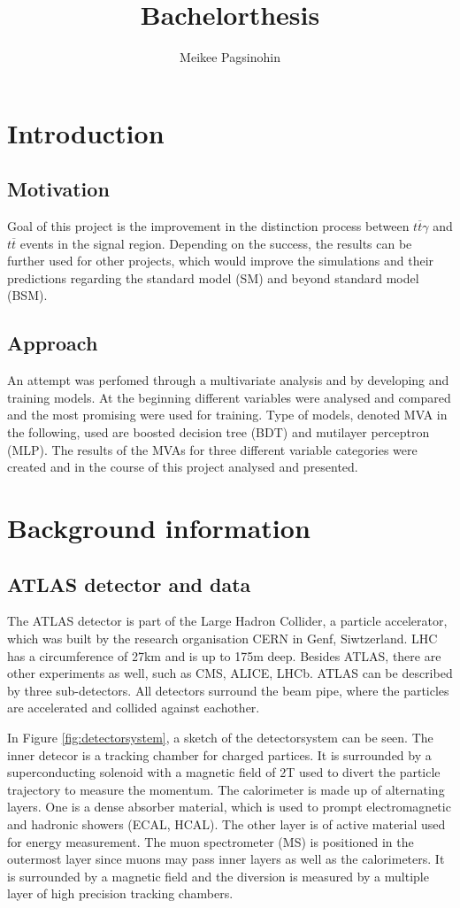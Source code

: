 \documentclass[11pt]{scrartcl}
\title{Bachelorthesis}
\author{Meikee Pagsinohin}
\begin{document}
\section{Introduction}

	\subsection{Motivation}
		Goal of this project is the improvement in the distinction process between $t\overline{t}\gamma$ and $t\overline{t}$ events in the signal region. Depending on the success, the results can be further used for other projects, which would improve the simulations and their predictions regarding the standard model (SM) and beyond standard model (BSM). 

	\subsection{Approach}
	\label{sec:approach}
		An attempt was perfomed through a multivariate analysis and by developing and training models. At the beginning different variables were analysed and compared and the most promising were used for training. Type of models, denoted MVA in the following, used are boosted decision tree (BDT) and mutilayer perceptron (MLP). The results of the MVAs for three different variable categories were created and in the course of this project analysed and presented.

\section{Background information}
	\subsection{ATLAS detector and data}
	The ATLAS detector is part of the Large Hadron Collider, a particle accelerator, which was built by the research organisation CERN in Genf, Siwtzerland. LHC has a circumference of 27km and is up to 175m deep. Besides ATLAS, there are other experiments as well, such as CMS, ALICE, LHCb. ATLAS can be described by three sub-detectors. All detectors surround the beam pipe, where the particles are accelerated and collided against eachother.
	
	In Figure \ref{fig:detectorsystem}, a sketch of the detectorsystem can be seen. The inner detecor is a tracking chamber for charged partices. It is surrounded by a superconducting solenoid with a magnetic field of 2T used to divert the particle trajectory to measure the momentum. The calorimeter is made up of alternating layers. One is a dense absorber material, which is used to prompt electromagnetic and hadronic showers (ECAL, HCAL). The other layer is of active material used for energy measurement. The muon spectrometer (MS) is positioned in the outermost layer since muons may pass inner layers as well as the calorimeters. It is surrounded by a magnetic field and the diversion is measured by a multiple layer of high precision tracking chambers. 
	
\end{document}
